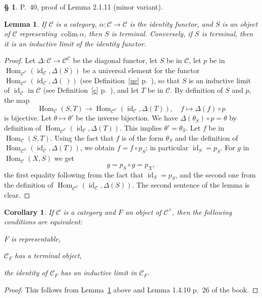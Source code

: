\documentclass[12pt]{article}%
\newtheorem{lem}[thm]{Lemma}
\newtheorem{cor}[thm]{Corollary}
\theoremstyle{remark}
\theoremstyle{definition}
\newtheorem{s}[thm]{\S}%
\newcommand{\nn}{\noindent}
\newcommand{\C}{\mathcal C}
\DeclareMathOperator*{\colim}{colim}
\DeclareMathOperator{\id}{id}
\DeclareMathOperator{\Hom}{Hom}%
\begin{document}
\begin{s} 
P.~40, proof of Lemma 2.1.11 (minor variant).
%
\begin{lem}\label{l2111}
If $\C$ is a category, $\alpha:\C\to\C$ is the identity functor, and $S$ is an object of $\C$ representing $\colim\alpha$, then $S$ is terminal. Conversely, if $S$ is terminal, then it is an inductive limit of the identity functor.
\end{lem}
%
\begin{proof}
Let $\Delta:\C\to\C^\C$ be the diagonal functor, let $S$ be in $\C$, let $p$ be in $\Hom_{\C^\C}(\id_\C,\Delta(S))$ be a universal element for the functor $\Hom_{\C^\C}(\id_\C,\Delta(\ ))$ (see Definition~\ref{ue} p.~\pageref{ue}), so that $S$ is an inductive limit of $\id_\C$ in $\C$ (see Definition~\ref{c} p.~\pageref{c}), and let $T$ be in $\C$. By definition of $S$ and $p$, the map 
$$
\Hom_\C(S,T)\to\Hom_{\C^\C}(\id_\C,\Delta(T)),\quad f\mapsto\Delta(f)\circ p 
$$ 
is bijective. Let $\theta\mapsto\theta'$ be the inverse bijection. We have $\Delta(\theta_S)\circ p=\theta$ by definition of $\Hom_{\C^\C}(\id_\C,\Delta(T))$. This implies $\theta'=\theta_S$. Let $f$ be in $\Hom_\C(S,T)$. Using the fact that $f$ is of the form $\theta_S$ and the definition of $\Hom_{\C^\C}(\id_\C,\Delta(T))$, we obtain $f=f\circ p_S$; in particular $\id_S=p_S$. For $g$ in $\Hom_\C(X,S)$ we get 
$$
g=p_S\circ g=p_X,
$$
the first equality following from the fact that $\id_S=p_S$, and the second one from the definition of $\Hom_{\C^\C}(\id_\C,\Delta(S))$. The second sentence of the lemma is clear.
\end{proof}

\begin{cor}\label{c2111}
If $\C$ is a category and $F$ an object of $\C^\wedge$, then the following conditions are equivalent:

\nn{\em(a)} $F$ is representable,

\nn{\em(b)} $\C_F$ has a terminal object,

\nn{\em(c)} the identity of $\C_F$ has an inductive limit in $\C_F$.
\end{cor}

\begin{proof}
This follows from Lemma~\ref{l2111} above and Lemma 1.4.10 p.~26 of the book.
\end{proof}
\end{s}

%
\end{document}
